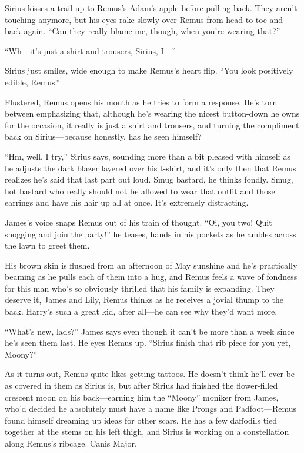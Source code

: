 Sirius kisses a trail up to Remus’s Adam’s apple before pulling back. They aren’t touching anymore, but his eyes rake slowly over Remus from head to toe and back again. “Can they really blame me, though, when you’re wearing that?”

“Wh—it’s just a shirt and trousers, Sirius, I—”

Sirius just smiles, wide enough to make Remus’s heart flip. “You look positively edible, Remus.”

Flustered, Remus opens his mouth as he tries to form a response. He’s torn between emphasizing that, although he’s wearing the nicest button-down he owns for the occasion, it really is just a shirt and trousers, and turning the compliment back on Sirius—because honestly, has he seen himself?

“Hm, well, I try,” Sirius says, sounding more than a bit pleased with himself as he adjusts the dark blazer layered over his t-shirt, and it’s only then that Remus realizes he’s said that last part out loud. Smug bastard, he thinks fondly. Smug, hot bastard who really should not be allowed to wear that outfit and those earrings and have his hair up all at once. It’s extremely distracting.

James’s voice snaps Remus out of his train of thought. “Oi, you two! Quit snogging and join the party!” he teases, hands in his pockets as he ambles across the lawn to greet them.

His brown skin is flushed from an afternoon of May sunshine and he’s practically beaming as he pulls each of them into a hug, and Remus feels a wave of fondness for this man who’s so obviously thrilled that his family is expanding. They deserve it, James and Lily, Remus thinks as he receives a jovial thump to the back. Harry’s such a great kid, after all—he can see why they’d want more.

“What’s new, lads?” James says even though it can’t be more than a week since he’s seen them last. He eyes Remus up. “Sirius finish that rib piece for you yet, Moony?”

As it turns out, Remus quite likes getting tattoos. He doesn’t think he’ll ever be as covered in them as Sirius is, but after Sirius had finished the flower-filled crescent moon on his back—earning him the “Moony” moniker from James, who’d decided he absolutely must have a name like Prongs and Padfoot—Remus found himself dreaming up ideas for other scars. He has a few daffodils tied together at the stems on his left thigh, and Sirius is working on a constellation along Remus’s ribcage. Canis Major.

